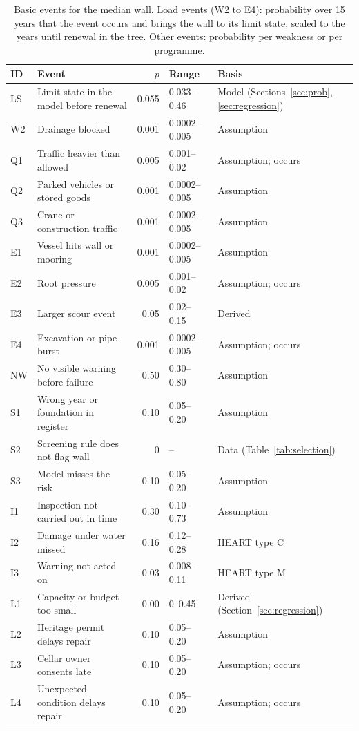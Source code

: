 \begin{table}[tbp]
\centering\footnotesize
\caption{Basic events for the median wall. Load events (W2 to E4): probability over 15 years that the event occurs and brings the wall to its limit state, scaled to the years until renewal in the tree. Other events: probability per weakness or per programme.}
\label{tab:ftprob}
\setlength{\tabcolsep}{4pt}
\begin{tabular}{@{}llrll@{}}
\toprule
ID & Event & $p$ & Range & Basis \\
\midrule
LS  & Limit state in the model before renewal & 0.055 & 0.033--0.46 & Model (Sections~\ref{sec:prob}, \ref{sec:regression}) \\
W2 & Drainage blocked & 0.001 & 0.0002--0.005 & Assumption \\
Q1 & Traffic heavier than allowed & 0.005 & 0.001--0.02 & Assumption; occurs \parencite{duic2021} \\
Q2 & Parked vehicles or stored goods & 0.001 & 0.0002--0.005 & Assumption \\
Q3 & Crane or construction traffic & 0.001 & 0.0002--0.005 & Assumption \\
E1 & Vessel hits wall or mooring & 0.001 & 0.0002--0.005 & Assumption \\
E2 & Root pressure & 0.005 & 0.001--0.02 & Assumption; occurs \parencite{duic2020} \\
E3 & Larger scour event & 0.05 & 0.02--0.15 & Derived \parencite{wijkbericht2024walmuur} \\
E4 & Excavation or pipe burst & 0.001 & 0.0002--0.005 & Assumption; occurs \parencite{wijkbericht2025rak5} \\
NW  & No visible warning before failure & 0.50 & 0.30--0.80 & Assumption \\
S1 & Wrong year or foundation in register & 0.10 & 0.05--0.20 & Assumption \\
S2 & Screening rule does not flag wall & 0 & -- & Data (Table~\ref{tab:selection}) \\
S3 & Model misses the risk & 0.10 & 0.05--0.20 & Assumption \\
I1 & Inspection not carried out in time & 0.30 & 0.10--0.73 & Assumption \parencite{utrecht_teamchallenge2026} \\
I2 & Damage under water missed & 0.16 & 0.12--0.28 & HEART type C \parencite{williams1986heart,heart_table_plos2021} \\
I3 & Warning not acted on & 0.03 & 0.008--0.11 & HEART type M \parencite{williams1986heart,heart_table_plos2021} \\
L1 & Capacity or budget too small & 0.00 & 0--0.45 & Derived (Section~\ref{sec:regression}) \\
L2 & Heritage permit delays repair & 0.10 & 0.05--0.20 & Assumption \\
L3 & Cellar owner consents late & 0.10 & 0.05--0.20 & Assumption; occurs \parencite{duic2020} \\
L4 & Unexpected condition delays repair & 0.10 & 0.05--0.20 & Assumption; occurs \parencite{duic2020} \\
\bottomrule
\end{tabular}
\end{table}

